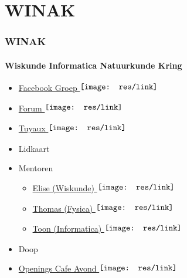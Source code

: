     \section{WINAK}
	\begin{frame}
		\frametitle{WINAK}
		\framesubtitle{\textbf{W}iskunde \textbf{I}nformatica \textbf{Na}tuurkunde \textbf{K}ring}
        
        \begin{itemize}
            \item\href{https://www.facebook.com/groups/2156957474519310/}{Facebook Groep $\vcenter{\hbox{\texttt{[image: res/link]}}\vspace{0.1cm}}$}
            \item\href{https://forum.winak.be/}{Forum $\vcenter{\hbox{\texttt{[image: res/link]}}\vspace{0.1cm}}$}
            \item\href{http://tuyaux.winak.be/}{Tuyaux $\vcenter{\hbox{\texttt{[image: res/link]}}\vspace{0.1cm}}$}
            \item Lidkaart
            \item Mentoren
            \begin{itemize}
            	\item\href {https://www.facebook.com/elise.verlinden.9} {Elise (Wiskunde) $\vcenter{\hbox{\texttt{[image: res/link]}}\vspace{0.1cm}}$}
            	\item\href {https://www.facebook.com/profile.php?id=100009929418782} {Thomas (Fysica) $\vcenter{\hbox{\texttt{[image: res/link]}}\vspace{0.1cm}}$}
				\item\href {https://www.facebook.com/toon.meynen.3} {Toon (Informatica) $\vcenter{\hbox{\texttt{[image: res/link]}}\vspace{0.1cm}}$}
			\end{itemize}
			\item Doop
            \item\href{https://www.facebook.com/events/243230606368223/}{Openings Cafe Avond $\vcenter{\hbox{\texttt{[image: res/link]}}\vspace{0.1cm}}$}
            
		\end{itemize}

	\end{frame}
    
